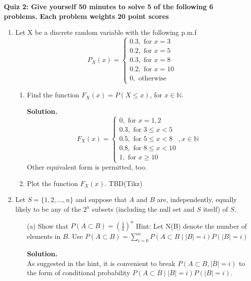 \documentclass[12pt]{article}
\begin{document}
\noindent
{\bf{Quiz 2: Give yourself 50 minutes to solve 5 of the following 6 problems. Each problem weights 20 point scores}}
\begin{enumerate}

\item
Let X be a discrete random variable with the following p.m.f
\[
    P_X(x) = \begin{cases}
        0.3, \text{ for } x = 3 \\
        0.2, \text{ for } x = 5 \\
        0.3, \text{ for } x = 8 \\
        0.2, \text{ for } x = 10 \\
        0, \text{ otherwise}
    \end{cases}
\]
\begin{enumerate}
    \item Find the function \(F_X(x) = P(X \leq  x)\), for \(x \in \mathbb{N}\).
    
    \textbf{Solution.} 
    \[
        F_X(x) = \begin{cases} 0,  \text{ for } x = 1,2 \\
            0.3, \text{ for } 3 \leq x < 5 \\
            0.5, \text{ for } 5 \leq  x < 8 \\
            0.8, \text{ for } 8 \leq x < 10 \\
            1, \text{ for } x \geq  10
        \end{cases}, x \in \mathbb{N}
    \] 
    Other equivalent form is permitted, too.
    \item Plot the function \(F_X(x)\).
        TBD(Tikz)
\end{enumerate}






\item
Let \(S = \{1,2,\dots, n\}\)  and suppose that \(A\) and \(B\) are, independently,
equally likely to be any of the \(2^n\) subsets (including the null set and \(S\) itself) of \(S\).

\begin{itemize}
    \item[(a)] Show that $ P(A \subset B) = (\frac{3}{4})^n$
    Hint: Let N(B) denote the number of elements in \(B\).
    Use $P (A \subset B )= \sum_{i=0}^{n} P(A \subset B \mid  |B| = i)P( |B| = i)$

    \textbf{Solution.}\\
    As suggested in the hint, it is convenient to break \(P(A \subset B, |B| = i)\) to the form of conditional probability \(P(A \subset B \mid  |B| = i)P( |B| = i) \). 
    

\end{itemize}
\end{enumerate}
\end{document}
